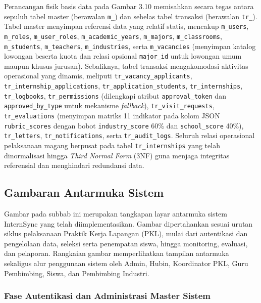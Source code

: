 {\raggedright
Perancangan fisik basis data pada Gambar 3.10 memisahkan secara tegas antara sepuluh tabel master (berawalan \texttt{m\_}) dan sebelas tabel transaksi (berawalan \texttt{tr\_}). Tabel master menyimpan referensi data yang relatif statis, mencakup \texttt{m\_users}, \texttt{m\_roles}, \texttt{m\_user\_roles}, \texttt{m\_academic\_years}, \texttt{m\_majors}, \texttt{m\_classrooms}, \texttt{m\_students}, \texttt{m\_teachers}, \texttt{m\_industries}, serta \texttt{m\_vacancies} (menyimpan katalog lowongan beserta kuota dan relasi opsional \texttt{major\_id} untuk lowongan umum maupun khusus jurusan). Sebaliknya, tabel transaksi mengakomodasi aktivitas operasional yang dinamis, meliputi \texttt{tr\_vacancy\_applicants}, \texttt{tr\_internship\_applications}, \texttt{tr\_application\_students}, \texttt{tr\_internships}, \texttt{tr\_logbooks}, \texttt{tr\_permissions} (dilengkapi atribut \texttt{approval\_token} dan \texttt{approved\_by\_type} untuk mekanisme \textit{fallback}), \texttt{tr\_visit\_requests}, \texttt{tr\_evaluations} (menyimpan matriks 11 indikator pada kolom JSON \texttt{rubric\_scores} dengan bobot \texttt{industry\_score} 60\% dan \texttt{school\_score} 40\%), \texttt{tr\_letters}, \texttt{tr\_notifications}, serta \texttt{tr\_audit\_logs}. Seluruh relasi operasional pelaksanaan magang berpusat pada tabel \texttt{tr\_internships} yang telah dinormalisasi hingga \textit{Third Normal Form} (3NF) guna menjaga integritas referensial dan menghindari redundansi data.
\par}

\subsection{Gambaran Antarmuka Sistem}

Gambar pada subbab ini merupakan tangkapan layar antarmuka sistem InternSync yang telah diimplementasikan. Gambar dipertahankan sesuai urutan siklus pelaksanaan Praktik Kerja Lapangan (PKL), mulai dari autentikasi dan pengelolaan data, seleksi serta penempatan siswa, hingga monitoring, evaluasi, dan pelaporan. Rangkaian gambar memperlihatkan tampilan antarmuka sekaligus alur penggunaan sistem oleh Admin, Hubin, Koordinator PKL, Guru Pembimbing, Siswa, dan Pembimbing Industri.

\subsubsection{Fase Autentikasi dan Administrasi Master Sistem}

